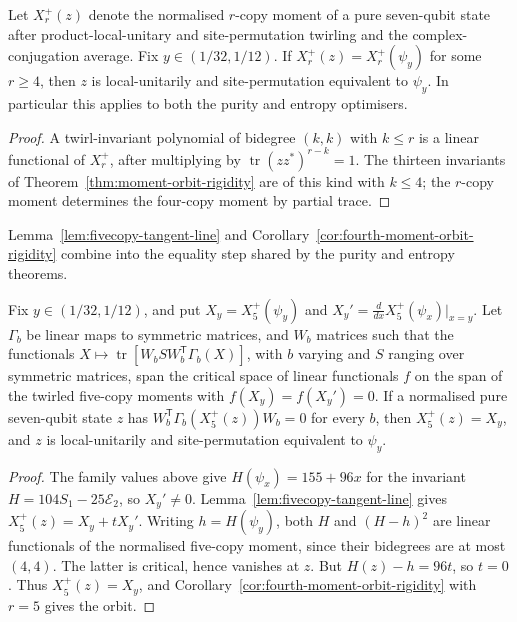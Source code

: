 \begin{corollary}\label{cor:fourth-moment-orbit-rigidity}
Let $X_r^+(z)$ denote the normalised $r$-copy moment of a pure seven-qubit
state after product-local-unitary and site-permutation twirling and the
complex-conjugation average. Fix $y\in(1/32,1/12)$. If
$X_r^+(z)=X_r^+(\psi_y)$ for some $r\ge4$, then $z$ is local-unitarily and
site-permutation equivalent to $\psi_y$. In particular this applies to
both the purity and entropy optimisers.
\end{corollary}
\begin{proof}
A twirl-invariant polynomial of bidegree $(k,k)$ with $k\le r$ is a
linear functional of $X_r^+$, after multiplying by
$\operatorname{tr}(zz^*)^{r-k}=1$.  The thirteen invariants of
Theorem~\ref{thm:moment-orbit-rigidity} are of this kind with $k\le4$;
the $r$-copy moment determines the four-copy moment by partial trace.
\end{proof}

Lemma~\ref{lem:fivecopy-tangent-line} and Corollary~\ref{cor:fourth-moment-orbit-rigidity}
combine into the equality step shared by the purity and entropy theorems.

\begin{theorem}
\label{thm:fivecopy-family-equality}
Fix $y\in(1/32,1/12)$, and put $X_y=X_5^+(\psi_y)$ and
$X_y'=\frac{d}{dx}X_5^+(\psi_x)|_{x=y}$. Let $\Gamma_b$ be linear maps to
symmetric matrices, and $W_b$ matrices such that
the functionals $X\mapsto\operatorname{tr}[W_bSW_b^{\mathsf T}\Gamma_b(X)]$,
  with $b$ varying and $S$ ranging over symmetric matrices, span the critical space of
  linear functionals $f$ on the span of the twirled five-copy moments with
  $f(X_y)=f(X_y')=0$.
If a normalised pure seven-qubit state $z$ has
$W_b^{\mathsf T}\Gamma_b(X_5^+(z))W_b=0$ for every $b$, then
$X_5^+(z)=X_y$, and $z$ is local-unitarily and site-permutation
equivalent to $\psi_y$.
\end{theorem}
\begin{proof}
The family values above give $H(\psi_x)=155+96x$ for the invariant
$H=104S_1-25\mathcal E_2$, so $X_y'\ne0$.
Lemma~\ref{lem:fivecopy-tangent-line} gives $X_5^+(z)=X_y+tX_y'$.
Writing $h=H(\psi_y)$, both $H$ and $(H-h)^2$ are linear functionals
of the normalised five-copy moment, since their bidegrees are at most $(4,4)$.
The latter is critical, hence vanishes at $z$. But
$H(z)-h=96t$, so $t=0$. Thus $X_5^+(z)=X_y$, and
Corollary~\ref{cor:fourth-moment-orbit-rigidity} with $r=5$ gives the orbit.
\end{proof}

